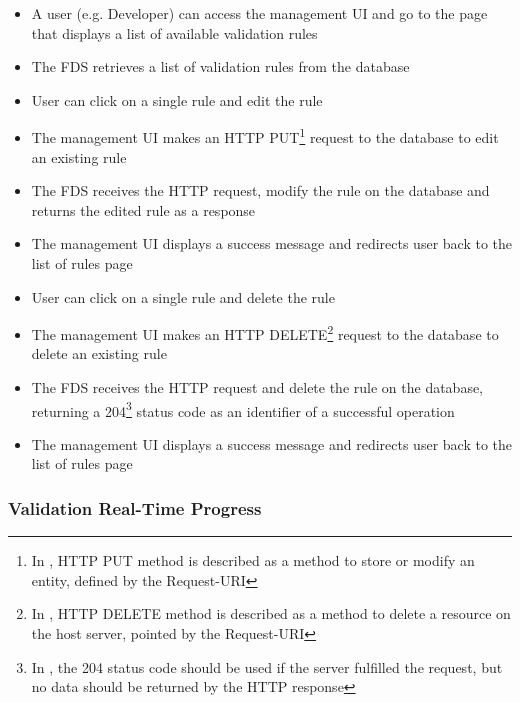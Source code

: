 \begin{itemize}
 \item A user (e.g. Developer) can access the management UI and go to the page that displays a list of available validation rules
 \item The FDS retrieves a list of validation rules from the database
 \item User can click on a single rule and edit the rule
 \item The management UI makes an HTTP PUT\footnote{In \autocite[\enquote{9.6 PUT}]{http-rfc}, HTTP PUT method is described as a method to store or modify an entity, defined by the Request-URI} request to the database to edit an existing rule
 \item The FDS receives the HTTP request, modify the rule on the database and returns the edited rule as a response
 \item The management UI displays a success message and redirects user back to the list of rules page
 \item User can click on a single rule and delete the rule
 \item The management UI makes an HTTP DELETE\footnote{In \autocite[\enquote{9.7 DELETE}]{http-rfc}, HTTP DELETE method is described as a method to delete a resource on the host server, pointed by the Request-URI} request to the database to delete an existing rule
 \item The FDS receives the HTTP request and delete the rule on the database, returning a 204\footnote{In \autocite[\enquote{10.2.5 204 No Content}]{http-rfc}, the 204 status code should be used if the server fulfilled the request, but no data should be returned by the HTTP response} status code as an identifier of a successful operation
 \item The management UI displays a success message and redirects user back to the list of rules page
\end{itemize} 


\subsubsection{Validation Real-Time Progress}

